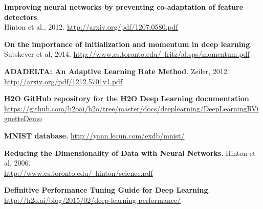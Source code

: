 \textbf{Improving neural networks by preventing co-adaptation of feature detectors}.  \\
{Hinton et al., 2012}.  \href{http://arxiv.org/pdf/1207.0580.pdf}{http://arxiv.org/pdf/1207.0580.pdf}

\textbf{On the importance of initialization and momentum in deep learning}.  {Sutskever et al, 2014}.  \href{http://www.cs.toronto.edu/~fritz/absps/momentum.pdf}{http://www.cs.toronto.edu/~fritz/absps/momentum.pdf}

\textbf{ADADELTA: An Adaptive Learning Rate Method}. {Zeiler, 2012}.  \\
 \href{http://arxiv.org/pdf/1212.5701v1.pdf}{http://arxiv.org/pdf/1212.5701v1.pdf}

\textbf{H2O GitHub repository for the H2O Deep Learning documentation} \\
 \href{https://github.com/h2oai/h2o/tree/master/docs/deeplearning/DeepLearningRVignetteDemo}{https://github.com/h2oai/h2o/tree/master/docs/deeplearning/DeepLearningRVignetteDemo}

\textbf{{MNIST database.}}  \href{http://yann.lecun.com/exdb/mnist/}{http://yann.lecun.com/exdb/mnist/}

\textbf{Reducing the Dimensionality of
Data with Neural Networks}.  {Hinton et al, 2006}. \\
 \href{http://www.cs.toronto.edu/~hinton/science.pdf}{http://www.cs.toronto.edu/~hinton/science.pdf}

\textbf{Definitive Performance Tuning Guide for Deep Learning}. \href{http://h2o.ai/blog/2015/02/deep-learning-performance/}{http://h2o.ai/blog/2015/02/deep-learning-performance/}






